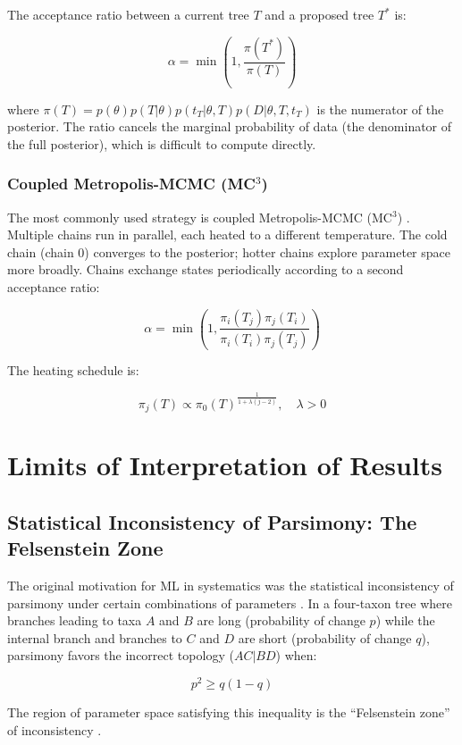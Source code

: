 The acceptance ratio between a current tree $T$ and a proposed tree $T^*$ is:

$$\alpha = \min\left(1, \frac{\pi(T^{*})}{\pi(T)}\right)$$

where $\pi(T) = p(\theta) p(T|\theta) p(t_T|\theta, T) p(D|\theta, T, t_T)$ is the numerator of the posterior. The ratio cancels the marginal probability of data (the denominator of the full posterior), which is difficult to compute directly.

\subsubsection{Coupled Metropolis-MCMC (MC$^3$)}

The most commonly used strategy is coupled Metropolis-MCMC (MC$^3$) \parencite{geyer1991}. Multiple chains run in parallel, each heated to a different temperature. The cold chain (chain 0) converges to the posterior; hotter chains explore parameter space more broadly. Chains exchange states periodically according to a second acceptance ratio:

$$\alpha = \min\left(1, \frac{\pi_i(T_j) \pi_j(T_i)}{\pi_i(T_i) \pi_j(T_j)} \right)$$

The heating schedule is:

$$\pi_j(T) \propto \pi_0(T)^{\frac{1}{1+\lambda(j-2)}}, \quad \lambda > 0$$

\section{Limits of Interpretation of Results}

\subsection{Statistical Inconsistency of Parsimony: The Felsenstein Zone}

The original motivation for ML in systematics was the statistical inconsistency of parsimony under certain combinations of parameters \parencite{felsenstein1978}. In a four-taxon tree where branches leading to taxa $A$ and $B$ are long (probability of change $p$) while the internal branch and branches to $C$ and $D$ are short (probability of change $q$), parsimony favors the incorrect topology ($AC|BD$) when:

$$p^2 \geq q(1-q)$$

The region of parameter space satisfying this inequality is the ``Felsenstein zone'' of inconsistency \parencite{wheeler2012}.

